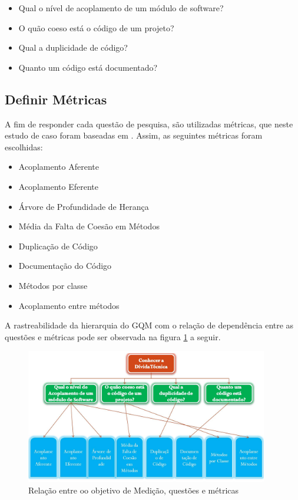 \begin{itemize}
  \item Qual o nível de acoplamento de um módulo de software?
  \item O quão coeso está o código de um projeto?
  \item Qual a duplicidade de código?
  \item Quanto um código está documentado?
\end{itemize}
\subsection{Definir Métricas}
A fim de responder cada questão de pesquisa, são utilizadas métricas, que neste
estudo de caso foram baseadas em \cite{siebra}. Assim, as seguintes métricas
foram escolhidas:

\begin{itemize}
  \item Acoplamento Aferente
  \item Acoplamento Eferente
  \item Árvore de Profundidade de Herança
  \item Média da Falta de Coesão em Métodos
  \item Duplicação de Código
  \item Documentação do Código
  \item Métodos por classe
  \item Acoplamento entre métodos
\end{itemize}

A rastreabilidade da hierarquia do GQM com o relação de dependência entre as questões
e métricas pode ser observada na figura \ref{fig:arvore} a seguir.

\begin{figure}[h]
  \centering
  \includegraphics[width=400px, scale=1]{figuras/arvore}
  \caption{Relação entre oo objetivo de Medição, questões e métricas}
  \label{fig:arvore}
\end{figure}
